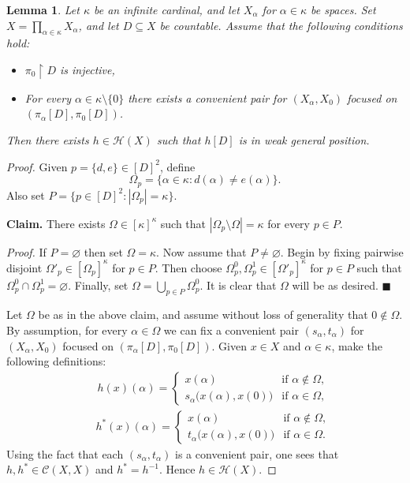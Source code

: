 \documentclass{amsart}
\theoremstyle{plain}
\newtheorem{lemma}[theorem]{Lemma}
\theoremstyle{definition}
\newcommand{\re}{\upharpoonright}
\newcommand{\CC}{\mathcal{C}}
\newcommand{\HH}{\mathcal{H}}
\begin{document}
\begin{lemma}\label{lemma_wgpp}
Let $\kappa$ be an infinite cardinal, and let $X_\alpha$ for $\alpha\in\kappa$ be spaces. Set $X=\prod_{\alpha\in\kappa}X_\alpha$, and let $D\subseteq X$ be countable. Assume that the following conditions hold:
\begin{itemize}
\item $\pi_0\re D$ is injective,
\item For every $\alpha\in\kappa\setminus\{0\}$ there exists a convenient pair for $(X_\alpha,X_0)$ focused on $(\pi_\alpha[D],\pi_0[D])$.
\end{itemize}
Then there exists $h\in\HH(X)$ such that $h[D]$ is in weak general position.
\end{lemma}
\begin{proof}
Given $p=\{d,e\}\in[D]^2$, define
$$
\Omega_p=\{\alpha\in\kappa:d(\alpha)\neq e(\alpha)\}.
$$
Also set $P=\{p\in [D]^2:|\Omega_p|=\kappa\}$.

\noindent\textbf{Claim.} There exists $\Omega\in [\kappa]^\kappa$ such that $|\Omega_p\setminus\Omega|=\kappa$ for every $p\in P$.

\noindent\textit{Proof.} If $P=\varnothing$ then set $\Omega=\kappa$. Now assume that $P\neq\varnothing$. Begin by fixing pairwise disjoint $\Omega'_p\in [\Omega_p]^\kappa$ for $p\in P$. Then choose $\Omega^0_p,\Omega^1_p\in [\Omega'_p]^\kappa$ for $p\in P$ such that $\Omega^0_p\cap\Omega^1_p=\varnothing$. Finally, set $\Omega=\bigcup_{p\in P}\Omega^0_p$. It is clear that $\Omega$ will be as desired. $\blacksquare$

Let $\Omega$ be as in the above claim, and assume without loss of generality that $0\notin\Omega$. By assumption, for every $\alpha\in\Omega$ we can fix a convenient pair $(s_\alpha,t_\alpha)$ for $(X_\alpha,X_0)$ focused on $(\pi_\alpha[D],\pi_0[D])$. Given $x\in X$ and $\alpha\in\kappa$, make the following definitions:
$$
\left.
\begin{array}{lcl}
& & h(x)(\alpha)= \left\{
\begin{array}{ll}
x(\alpha) & \textrm{if }\alpha\notin\Omega,\\
s_\alpha\big(x(\alpha),x(0)\big) & \textrm{if }\alpha\in\Omega,
\end{array}
\right.
\end{array}
\right.
$$
$$
\left.
\begin{array}{lcl}
& & h^\ast(x)(\alpha)= \left\{
\begin{array}{ll}
x(\alpha) & \textrm{if }\alpha\notin\Omega,\\
t_\alpha\big(x(\alpha),x(0)\big) & \textrm{if }\alpha\in\Omega.
\end{array}
\right.
\end{array}
\right.
$$
Using the fact that each $(s_\alpha,t_\alpha)$ is a convenient pair, one sees that $h,h^\ast\in\CC(X,X)$ and $h^\ast=h^{-1}$. Hence $h\in\HH(X)$.


\end{proof}
\end{document}
